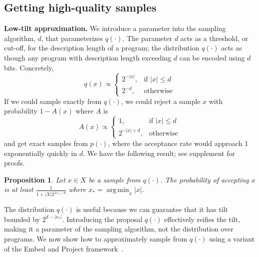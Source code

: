 \documentclass{article}
\DeclareMathOperator*{\argmin}{arg\,min} %
\DeclareMathOperator{\argmin}{argmin} %
\newtheorem{proposition}{Proposition}
\begin{document}
\subsection{Getting high-quality samples}
\textbf{Low-tilt approximation.}
We introduce a parameter into the sampling algorithm, $d$, that parameterizes $q(\cdot )$.
The parameter $d$ acts as a threshold, or cut-off, for the description length of a program;
the distribution $q(\cdot )$ acts as though any program with description length exceeding $d$ can be encoded using $d$ bits. Concretely,
\begin{equation}
  q(x) \propto \begin{cases}
    2^{-\lvert x \rvert },& \text{if } \lvert x \rvert \leq d\\
    2^{-d},              & \text{otherwise}
\end{cases}
  \end{equation}
If we could sample exactly from $q(\cdot )$, we could reject a sample $x$ with probability $1-A(x)$ where $A$ is
\begin{equation}
  A(x) \propto \begin{cases}
    1,& \text{if } \lvert x \rvert \leq d\\
    2^{-\lvert x \rvert +d},              & \text{otherwise}
    \end{cases}
  \end{equation}
and get exact samples from $p(\cdot )$, where the acceptance rate would approach 1 exponentially quickly in $d$. We have the following result; see supplement for proofs.
\begin{proposition}\label{acceptanceBound}
  Let $x\in X$ be a sample from $q(\cdot )$. The probability of accepting $x$ is at least $\frac{1}{1 + |X|2^{\lvert x_* \rvert -d}}$ where $x_* = \argmin_x \lvert x \rvert $.
\end{proposition}


The distribution $q(\cdot )$ is useful because we can guarantee that it has tilt bounded by
$2^{d - \lvert x_* \rvert }$.
Introducing the proposal $q(\cdot )$ effectively reifies the tilt,
making it a parameter of the sampling algorithm,
not the distribution over programs.
We now show how to approximately sample from $q(\cdot )$ using a variant of the Embed and Project framework~\cite{ermon2013embed}.
\end{document}

